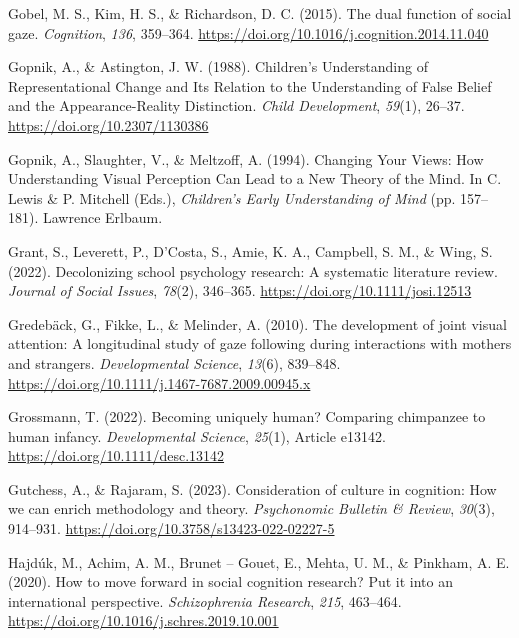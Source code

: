\documentclass[
]{scrbook}
\newlength{\cslhangindent}
\newenvironment{CSLReferences}[2] %
 {\begin{list}{}{%
  \setlength{\itemindent}{0pt}
  \setlength{\leftmargin}{0pt}
  \setlength{\parsep}{0pt}
  \ifodd #1
   \setlength{\leftmargin}{\cslhangindent}
   \setlength{\itemindent}{-1\cslhangindent}
  \fi
  \setlength{\itemsep}{#2\baselineskip}}}
 {\end{list}}
\begin{document}
\begin{CSLReferences}{1}{0}
Gobel, M. S., Kim, H. S., \& Richardson, D. C. (2015). The dual function of social gaze. \emph{Cognition}, \emph{136}, 359--364. \url{https://doi.org/10.1016/j.cognition.2014.11.040}

Gopnik, A., \& Astington, J. W. (1988). Children's {Understanding} of {Representational Change} and {Its Relation} to the {Understanding} of {False Belief} and the {Appearance-Reality Distinction}. \emph{Child Development}, \emph{59}(1), 26--37. \url{https://doi.org/10.2307/1130386}

Gopnik, A., Slaughter, V., \& Meltzoff, A. (1994). Changing {Your Views}: {How Understanding Visual Perception Can Lead} to a {New Theory} of the {Mind}. In C. Lewis \& P. Mitchell (Eds.), \emph{Children's {Early Understanding} of {Mind}} (pp. 157--181). Lawrence Erlbaum.

Grant, S., Leverett, P., D'Costa, S., Amie, K. A., Campbell, S. M., \& Wing, S. (2022). Decolonizing school psychology research: {A} systematic literature review. \emph{Journal of Social Issues}, \emph{78}(2), 346--365. \url{https://doi.org/10.1111/josi.12513}

Gredebäck, G., Fikke, L., \& Melinder, A. (2010). The development of joint visual attention: A longitudinal study of gaze following during interactions with mothers and strangers. \emph{Developmental Science}, \emph{13}(6), 839--848. \url{https://doi.org/10.1111/j.1467-7687.2009.00945.x}

Grossmann, T. (2022). Becoming uniquely human? {Comparing} chimpanzee to human infancy. \emph{Developmental Science}, \emph{25}(1), Article e13142. \url{https://doi.org/10.1111/desc.13142}

Gutchess, A., \& Rajaram, S. (2023). Consideration of culture in cognition: {How} we can enrich methodology and theory. \emph{Psychonomic Bulletin \& Review}, \emph{30}(3), 914--931. \url{https://doi.org/10.3758/s13423-022-02227-5}

Hajdúk, M., Achim, A. M., Brunet -- Gouet, E., Mehta, U. M., \& Pinkham, A. E. (2020). How to move forward in social cognition research? {Put} it into an international perspective. \emph{Schizophrenia Research}, \emph{215}, 463--464. \url{https://doi.org/10.1016/j.schres.2019.10.001}


\end{CSLReferences}
\end{document}
